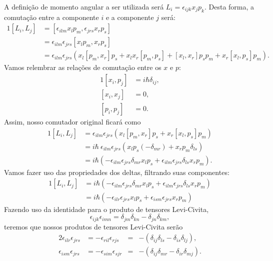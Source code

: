 \documentclass{article}
\newcommand{\commut}[2]{\left[ #1 , #2 \right]}
\begin{document}
A definição de momento angular a ser utilizada será $L_i = \epsilon_{ijk}x_j p_k$. Desta forma, a comutação entre a componente $i$ e a componente $j$ será:
\begin{alignat}{1}
\nonumber
 \commut{L_i}{L_j} &= \commut{\epsilon_{ilm}x_l p_m}{\epsilon_{jrs}x_r p_s}\\ \nonumber
 &= \epsilon_{ilm}\epsilon_{jrs}\commut{x_l p_m}{x_r p_s} \\ \nonumber
 &= \epsilon_{ilm}\epsilon_{jrs} \left( x_l \commut{p_m}{x_r} p_s + x_l x_r \commut{p_m}{p_s} + \commut{x_l}{x_r}p_s p_m + x_r \commut{x_l}{p_s} p_m \right)\mathrm{.}
\end{alignat}
Vamos relembrar as relações de comutação entre os $x$ e $p$:
\begin{alignat}{1}
 \commut{x_i}{p_j} &= i\hbar\delta_{ij}\mathrm{,}\\
 \commut{x_i}{x_j} &= 0\mathrm{,}\\
 \commut{p_i}{p_j} &= 0\mathrm{.}
\end{alignat}
Assim, nosso comutador original ficará como
\begin{alignat}{1}
 \nonumber
 \commut{L_i}{L_j} &= \epsilon_{ilm}\epsilon_{jrs} \left( x_l \commut{p_m}{x_r} p_s + x_r \commut{x_l}{p_s} p_m \right) \\ \nonumber
 &= i \hbar\ \epsilon_{ilm}\epsilon_{jrs} \left( x_l p_s (-\delta_{mr}) + x_r p_m \delta_{ls} \right) \\ \nonumber
 &= i \hbar \left(-\epsilon_{ilm}\epsilon_{jrs} \delta_{mr} x_l p_s +\epsilon_{ilm}\epsilon_{jrs} \delta_{ls} x_r p_m \right) \mathrm{.}
\end{alignat}
Vamos fazer uso das propriedades dos deltas, filtrando suas componentes:
\begin{alignat}{1}
 \nonumber
 \commut{L_i}{L_j} &= i \hbar \left(-\epsilon_{ilm}\epsilon_{jrs} \delta_{mr} x_l p_s +\epsilon_{ilm}\epsilon_{jrs} \delta_{ls} x_r p_m \right) \\
 &= i \hbar \left(-\epsilon_{ilr}\epsilon_{jrs} x_l p_s +\epsilon_{ism}\epsilon_{jrs} x_r p_m \right)
\end{alignat}
Fazendo uso da identidade para o produto de tensores Levi-Civita,
\begin{equation}
 \epsilon_{ijk}\epsilon_{imn} = \delta_{jm}\delta_{kn} - \delta_{jn}\delta_{km}\mathrm{,}
\end{equation}
teremos que nossos produtos de tensores Levi-Civita serão
\begin{alignat}{2}
 \epsilon_{ilr}\epsilon_{jrs} &= -\epsilon_{ril}\epsilon_{rjs} &=& -\left( \delta_{ij}\delta_{ls} - \delta_{is}\delta_{lj} \right) \mathrm{,}\\
 \epsilon_{ism}\epsilon_{jrs} &= -\epsilon_{sim}\epsilon_{sjr} &=& -\left( \delta_{ij}\delta_{mr} - \delta_{ir}\delta_{mj} \right) \mathrm{.}
\end{alignat}
\end{document}
